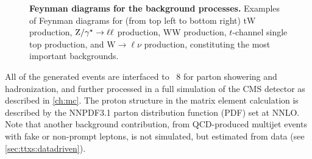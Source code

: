 \begin{figure}[t]
    \vspace{0.3cm}
    \hspace{1.0cm}
    \caption{\textbf{Feynman diagrams for the background processes.} Examples of Feynman diagrams for (from top left to bottom right) tW production, $\mathrm{Z}/\gamma^\star \rightarrow \ell\ell$ production, WW production, $t$-channel single top production, and $\mathrm{W} \rightarrow \ell\nu$ production, constituting the most important backgrounds.}
    \label{fig:ttxs:feynman}
\end{figure}

All of the generated events are interfaced to \pythia~8 for parton showering and hadronization, and further processed in a full simulation of the CMS detector as described in \cref{ch:mc}. The proton structure in the matrix element calculation is described by the NNPDF3.1 parton distribution function (PDF) set at NNLO. Note that another background contribution, from QCD-produced multijet events with fake or non-prompt leptons, is not simulated, but estimated from data (see \cref{sec:ttxs:datadriven}).

